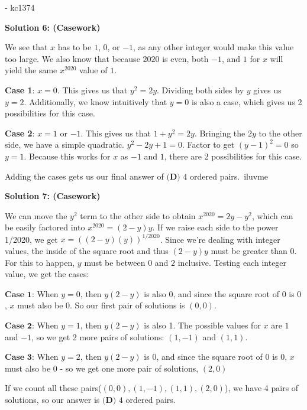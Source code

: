\begin{enumerate}
 - kc1374

 



\textbf{Solution 6: (Casework)}

We see that $x$ has to be $1$, $0$, or $-1$, as any other integer would make this value too large. We also know that because $2020$ is even, both $-1$, and $1$ for $x$ will yield the same $x^{2020}$ value of $1$. 

 \textbf{Case 1}: $x=0$. This gives us that $y^2 = 2y$. Dividing both sides by $y$ gives us $y = 2$. Additionally, we know intuitively that $y = 0$ is also a case, which gives us 2 possibilities for this case.

 \textbf{Case 2}: $x = 1$ or $-1$. This gives us that $1 + y^2 = 2y$. Bringing the $2y$ to the other side, we have a simple quadratic.  $y^2-2y + 1 = 0$. Factor to get $(y-1)^2 = 0$ so $y = 1$. Because this works for $x$ as $-1$ and $1$, there are 2 possibilities for this case.

 Adding the cases gets us our final answer of $\boxed{\textbf{(D) } 4}$ ordered pairs.~iluvme

 


 



\textbf{Solution 7: (Casework)}

We can move the $y^2$ term to the other side to obtain $x^{2020} = 2y - y^2$, which can be easily factored into $x^{2020} = (2-y)y$. If we raise each side to the power 1/2020, we get $x = ((2-y)(y))^{1/2020}$. Since we're dealing with integer values, the inside of the square root and thus $(2-y)y$ must be greater than $0$. For this to happen, $y$ must be between $0$ and $2$ inclusive. Testing each integer value, we get the cases:

 $\textbf{Case 1}$: When $y=0$, then $y(2-y)$ is also 0, and since the square root of $0$ is $0$, $x$ must also be $0$. So our first pair of solutions is $(0,0)$. 

 $\textbf{Case 2}$: When $y=1$, then $y(2-y)$ is also 1. The possible values for $x$ are $1$ and $-1$, so we get 2 more pairs of solutions: $(1, -1)$ and $(1,1)$. 

 $\textbf{Case 3}$: When $y=2$, then $y(2-y)$ is $0$, and since the square root of $0$ is $0$, $x$ must also be $0$ - so we get one more pair of solutions, $(2,0)$

 If we count all these pairs($(0,0),(1,-1),(1,1),(2,0)$), we have 4 pairs of solutions, so our answer is  $\boxed{\textbf{(D) } 4}$ ordered pairs. 


\end{enumerate}
